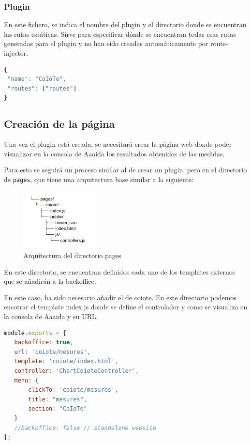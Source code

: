 \subsubsection{Plugin} 

En este fichero, se indica el nombre del plugin y el directorio donde se encuentran
las rutas estáticas. Sirve para especificar dónde se encuentran todas esas rutas generadas para el plugin y no han sido creadas automáticamente por route-injector. 

\begin{lstlisting}[language=JavaScript]
{
 "name": "CoIoTe",
 "routes": ["routes"]
}
\end{lstlisting}

\subsection{Creación de la página}

Una vez el plugin está creada, se necesitará crear la página web donde poder visualizar en la consola de Aaaida los resultados obtenidos de las medidas. 

Para esto se seguirá un proceso similar al de crear un plugin, pero en el directorio de \texttt{pages}, que tiene una arquitectura base similar a la siguiente:  

\begin{figure}[htb]
\begin{center}
\includegraphics[width=0.35\textwidth]{./setup/arc2}
\caption{Arquitectura del directorio pages}
\end{center}
\end{figure}


En este directorio, se encuentran definidos cada uno de los templates externos que se añadirán a la backoffice.

En este caso, ha sido necesario añadir el de coiote. En este directorio podemos encotrar el template index.js donde se define el controlador y como se visualiza en la consola de Aaaida y su URL. 

\begin{lstlisting}[language=JavaScript]
module.exports = {
   backoffice: true,
   url: 'coiote/mesures',
   template: 'coiote/index.html',
   controller: 'ChartCoioteController',
   menu: {
       clickTo: 'coiote/mesures',
       title: "mesures",
       section: "CoIoTe"
   }
   //backoffice: false // standalone website
};
\end{lstlisting}

